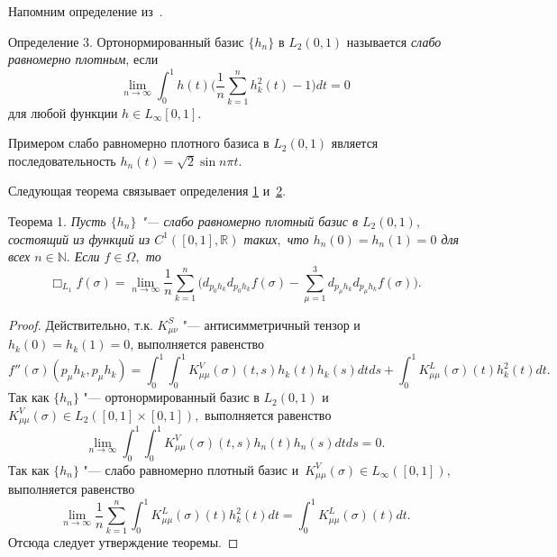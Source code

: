 \smallskip

Напомним определение из~\cite{volkov:bib:L}.

\smallskip

\hypertarget{volk:def3}{}

{\small \sc Определение 3}. Ортонормированный базис  $\{h_n\}$ в  $L_2(0, 1)$
 называется {\it слабо равномерно плотным}, если 
 $$\lim_{n\to\infty}\int_0^1 h(t) \biggl(\frac 1n\sum_{k=1}^n h_k^2(t)-1\biggr)dt=0$$
для любой функции $h\in L_{\infty}[0, 1]$.


\smallskip

Примером слабо равномерно плотного базиса в  $L_2(0, 1)$ является последовательность $h_n(t)=\sqrt{2}\sin{n\pi t}$.

Следующая теорема связывает определения \hyperlink{volk:def1}{1} и~\hyperlink{volk:def2}{2}.

\smallskip

\hypertarget{volk:th1}{}

{\small\sc Теорема 1}. {\it Пусть $\{h_n\}$ "---  слабо равномерно плотный базис в $L_2(0, 1),$ состоящий из функций
из $C^1([0, 1],\mathbb{R})$ таких$,$ что
$h_n(0)=h_n(1)=0$ для всех $n\in\mathbb{N}.$ 
Если $f\in \Omega,$ то
\begin{equation}
\Box_{L_1}f(\sigma)=\lim_{n\to\infty}\frac 1n\sum_{k=1}^n \biggl(d_{p_0h_k}d_{p_0h_k}f(\sigma)-\sum_{\mu=1}^3
d_{p_\mu h_k}d_{p_\mu h_k}f(\sigma)\biggr).
\end{equation}
}

\smallskip

\begin{proof}
Действительно, т.к. $K^S_{\mu\nu}$ "--- антисимметричный тензор и~$h_k(0)=h_k(1)=0$, выполняется равенство
$$
f''(\sigma)(p_\mu h_k,p_\mu h_k)=\int_0^1\int_0^1K^V_{\mu\mu}(\sigma)(t,s)h_k(t)h_k(s)dtds
+\int_0^1K^L_{\mu\mu}(\sigma)(t)h^2_k(t)dt.
$$
Так как $\{h_n\}$ "--- ортонормированный базис в $L_2(0, 1)$ и~$K^V_{\mu\mu}(\sigma)\in L_2([0, 1]\times[0, 1]),$ выполняется равенство
$$
\lim_{n\to\infty}\int_0^1\int_0^1K^V_{\mu\mu}(\sigma)(t,s)h_n(t)h_n(s)dtds=0.
$$
Так как  $\{h_n\}$ "---  слабо равномерно плотный базис и~$K^V_{\mu\mu}(\sigma)\in L_\infty([0, 1]),$ выполняется равенство
$$
\lim_{n\to\infty}\frac 1n\sum_{k=1}^n\int_0^1K^L_{\mu\mu}(\sigma)(t)h^2_k(t)dt=\int_0^1K^L_{\mu\mu}(\sigma)(t)dt.
$$
Отсюда следует утверждение теоремы.
\end{proof}

